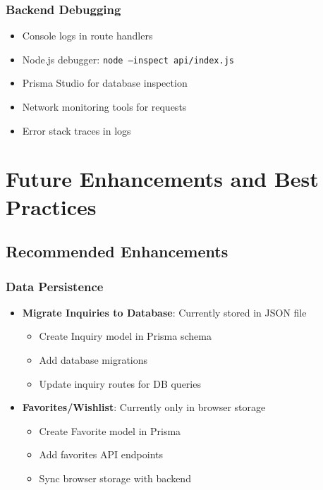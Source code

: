 \documentclass[12pt,a4paper]{report}
\begin{document}
\subsection{Backend Debugging}

\begin{itemize}
    \item Console logs in route handlers
    \item Node.js debugger: \texttt{node --inspect api/index.js}
    \item Prisma Studio for database inspection
    \item Network monitoring tools for requests
    \item Error stack traces in logs
\end{itemize}

\newpage

\chapter{Future Enhancements and Best Practices}

\section{Recommended Enhancements}

\subsection{Data Persistence}

\begin{itemize}
    \item \textbf{Migrate Inquiries to Database}: Currently stored in JSON file
        \begin{itemize}
            \item Create Inquiry model in Prisma schema
            \item Add database migrations
            \item Update inquiry routes for DB queries
        \end{itemize}
    
    \item \textbf{Favorites/Wishlist}: Currently only in browser storage
        \begin{itemize}
            \item Create Favorite model in Prisma
            \item Add favorites API endpoints
            \item Sync browser storage with backend
        \end{itemize}
\end{itemize}
\end{document}
